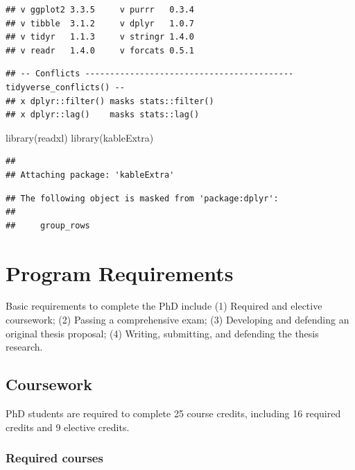 \documentclass[
]{book}
\newenvironment{Shaded}{\begin{snugshade}}{\end{snugshade}}
\newcommand{\FunctionTok}[1]{\textcolor[rgb]{0.00,0.00,0.00}{#1}}
\newcommand{\NormalTok}[1]{#1}
\begin{document}
\begin{verbatim}
## v ggplot2 3.3.5     v purrr   0.3.4
## v tibble  3.1.2     v dplyr   1.0.7
## v tidyr   1.1.3     v stringr 1.4.0
## v readr   1.4.0     v forcats 0.5.1
\end{verbatim}

\begin{verbatim}
## -- Conflicts ------------------------------------------ tidyverse_conflicts() --
## x dplyr::filter() masks stats::filter()
## x dplyr::lag()    masks stats::lag()
\end{verbatim}

\begin{Shaded}
\begin{Highlighting}[]
\FunctionTok{library}\NormalTok{(readxl)}
\FunctionTok{library}\NormalTok{(kableExtra)}
\end{Highlighting}
\end{Shaded}

\begin{verbatim}
## 
## Attaching package: 'kableExtra'
\end{verbatim}

\begin{verbatim}
## The following object is masked from 'package:dplyr':
## 
##     group_rows
\end{verbatim}

\hypertarget{program-requirements}{%
\chapter{Program Requirements}\label{program-requirements}}

Basic requirements to complete the PhD include (1) Required and elective coursework; (2) Passing a comprehensive exam; (3) Developing and defending an original thesis proposal; (4) Writing, submitting, and defending the thesis research.

\hypertarget{coursework-1}{%
\section{Coursework}\label{coursework-1}}

PhD students are required to complete 25 course credits, including 16 required credits and 9 elective credits.

\hypertarget{required-courses-1}{%
\subsection{Required courses}\label{required-courses-1}}
\end{document}
